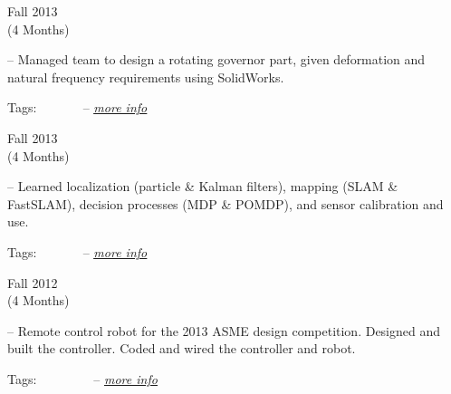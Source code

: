 
\flushleft \begin{minipage}[t]{\dateColWidth}
Fall 2013 \\
(4 Months)
\end{minipage}
\begin{minipage}[t]{0.8\textwidth}
	--
	Managed team to design a rotating governor part, given deformation and natural frequency requirements using SolidWorks. 
	
	Tags:
	 \vline\ 
	 \vline\
	 \vline\
	 \vline\
	--
	\href{http://claytonketner.com/cad-at-a-glance/}{\uline{\textit{more info}}}
\end{minipage}

\divLine

\flushleft \begin{minipage}[t]{\dateColWidth}
Fall 2013 \\
(4 Months)
\end{minipage}
\begin{minipage}[t]{0.8\textwidth}
	--
	Learned localization (particle \& Kalman filters), mapping (SLAM \& FastSLAM), decision processes (MDP \& POMDP), and sensor calibration and use.
	
	Tags:
	 \vline\
	 \vline\
	 \vline\
	 \vline\
	--
	\href{http://claytonketner.com/intro-to-robotics-class}{\uline{\textit{more info}}}
\end{minipage}

\divLine

\flushleft \begin{minipage}[t]{\dateColWidth}
Fall 2012 \\
(4 Months)
\end{minipage}
\begin{minipage}[t]{0.8\textwidth}
	--
	Remote control robot for the 2013 ASME design competition. Designed and built the controller. Coded and wired the controller and robot.

	Tags:
	 \vline\ 
	 \vline\ 
	 \vline\ 
	 \vline\ 
	 \vline\ 
	--
	\href{http://www.claytonketner.com/senior-project-robot/}{\uline{\textit{more info}}}
\end{minipage}

